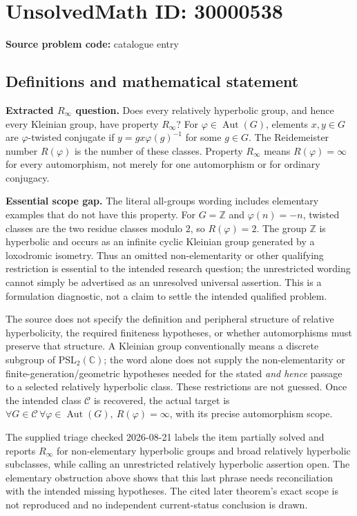\documentclass[11pt]{article}
\newcommand{\Z}{\mathbb{Z}}
\newcommand{\C}{\mathbb{C}}
\begin{document}
\section*{UnsolvedMath ID: 30000538}
\textbf{Source problem code:} catalogue entry
\subsection{Definitions and mathematical statement}
\textbf{Extracted \(R_\infty\) question.} Does every relatively hyperbolic group, and hence every Kleinian group, have property \(R_\infty\)? For \(\varphi\in\operatorname{Aut}(G)\), elements \(x,y\in G\) are \(\varphi\)-twisted conjugate if \(y=gx\varphi(g)^{-1}\) for some \(g\in G\). The Reidemeister number \(R(\varphi)\) is the number of these classes. Property \(R_\infty\) means \(R(\varphi)=\infty\) for every automorphism, not merely for one automorphism or for ordinary conjugacy.\par \textbf{Essential scope gap.} The literal all-groups wording includes elementary examples that do not have this property. For \(G=\Z\) and \(\varphi(n)=-n\), twisted classes are the two residue classes modulo \(2\), so \(R(\varphi)=2\). The group \(\Z\) is hyperbolic and occurs as an infinite cyclic Kleinian group generated by a loxodromic isometry. Thus an omitted non-elementarity or other qualifying restriction is essential to the intended research question; the unrestricted wording cannot simply be advertised as an unresolved universal assertion. This is a formulation diagnostic, not a claim to settle the intended qualified problem.\par The source does not specify the definition and peripheral structure of relative hyperbolicity, the required finiteness hypotheses, or whether automorphisms must preserve that structure. A Kleinian group conventionally means a discrete subgroup of \(\mathrm{PSL}_2(\C)\); the word alone does not supply the non-elementarity or finite-generation/geometric hypotheses needed for the stated \emph{and hence} passage to a selected relatively hyperbolic class. These restrictions are not guessed. Once the intended class \(\mathcal C\) is recovered, the actual target is \(\forall G\in\mathcal C\,\forall\varphi\in\operatorname{Aut}(G),\ R(\varphi)=\infty\), with its precise automorphism scope.\par The supplied triage checked 2026-08-21 labels the item partially solved and reports \(R_\infty\) for non-elementary hyperbolic groups and broad relatively hyperbolic subclasses, while calling an unrestricted relatively hyperbolic assertion open. The elementary obstruction above shows that this last phrase needs reconciliation with the intended missing hypotheses. The cited later theorem's exact scope is not reproduced and no independent current-status conclusion is drawn.
\end{document}
